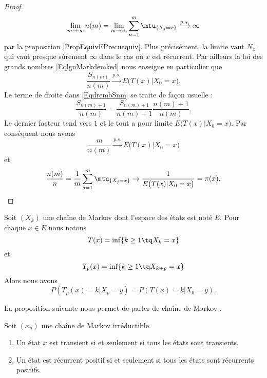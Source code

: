 \begin{proof}
\begin{equation}
         \lim_{m\to \infty}  n(m)=\lim_{m\to \infty} \sum_{n=1}^m\mtu_{\{ X_j=x \}}\stackrel{p.s.}{\longrightarrow}\infty
     \end{equation}
     par la proposition \eqref{PropEquivEPrecuequiv}. Plus précisément, la limite vaut \( N_x\) qui vaut presque sûrement \( \infty\) dans le cas où \( x\) est récurrent. Par ailleurs la loi des grands nombres \eqref{EqlgnMarkdemked} nous enseigne en particulier que
     \begin{equation}
         \frac{ S_{n(m)} }{ n(m) }\stackrel{p.s.}{\longrightarrow} E\big( T(x)|X_0=x \big).
     \end{equation}
     Le terme de droite dans \eqref{EqdrembSnm} se traite de façon usuelle :
     \begin{equation}
         \frac{ S_{n(m)+1} }{ n(m) }=\frac{ S_{n(m)+1} }{ n(m)+1 }\frac{ n(m)+1 }{ n(m) }.
     \end{equation}
     Le dernier facteur tend vers \( 1\) et le tout a pour limite \( E\big( T(x)|X_0=x \big)\). Par conséquent nous avons
     \begin{equation}
         \frac{ m }{ n(m) }\stackrel{p.s.}{\longrightarrow}E\big( T(x)|X_0=x \big)
     \end{equation}
     et 
     \begin{equation}
         \frac{ n(m) }{ n }=\frac{1}{ m }\sum_{j=1}^m\mtu_{\{ X_j=x \}}\to\frac{1}{ E\big( T(x)|X_0=x \big) }=\pi(x).
     \end{equation}
\end{proof}

\begin{lemma}       \label{LembyftKs}
    Soit $(X_k)$ une chaîne de Markov dont l'espace des états est noté $E$. Pour chaque $ x\in E$ nous notons 
    \begin{equation}
        T(x)=\inf\{ k\geq 1\tq X_k=x \}
    \end{equation}
    et
    \begin{equation}
        T_p(x)=\inf\{ k\geq 1\tq X_{k+p}=x \}
    \end{equation}
    Alors nous avons
    \begin{equation}
        P(T_p(x)=k|X_p=y)=P(T(x)=k|X_0=y).
    \end{equation}
\end{lemma}

La proposition suivante nous permet de parler de chaîne de Markov .
\begin{proposition}     \label{PropUyLCzp}
    Soit \( (x_n)\) une chaîne de Markov irréductible.
    \begin{enumerate}
        \item
            Un état \( x\) est transient si et seulement si tous les états sont transients.
        \item
            Un état est récurrent positif  si et seulement si tous les états sont récurrents positifs.
    \end{enumerate}
\end{proposition}

